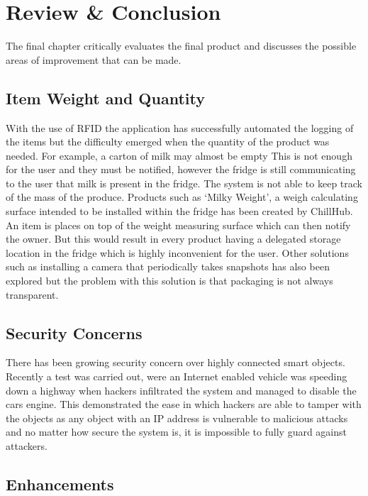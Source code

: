 \documentclass[a4paper, 11pt]{article}
\begin{document}
\clearpage
\section{Review \& Conclusion}
The final chapter critically evaluates the final product and discusses the possible areas of improvement that can be made.

\subsection{Item Weight and Quantity} With the use of RFID the application has successfully automated the logging of the items but the difficulty emerged when the quantity of the product was needed. For example, a carton of milk may almost be empty This is not enough for the user and they must be notified, however the fridge is still communicating to the user that milk is present in the fridge. The system is not able to keep track of the mass of the produce. Products such as `Milky Weight', a weigh calculating surface intended to be installed within the fridge has been created by ChillHub. An item is places on top of the weight measuring surface which can then notify the owner. But this would result in every product having a delegated storage location in the fridge which is highly inconvenient for the user.\cite{milky} Other solutions such as installing a camera that periodically takes snapshots has also been explored but the problem with this solution is that packaging is not always transparent. 

\subsection{Security Concerns}There has been growing security concern over highly connected smart objects. Recently a test was carried out, were an Internet enabled vehicle was speeding down a highway when hackers infiltrated the system and managed to disable the cars engine.\cite{jeep} This demonstrated the ease in which hackers are able to tamper with the objects as any object with an IP address is vulnerable to malicious attacks and no matter how secure the system is, it is impossible to fully guard against attackers.  

\subsection{Enhancements}
\end{document}
